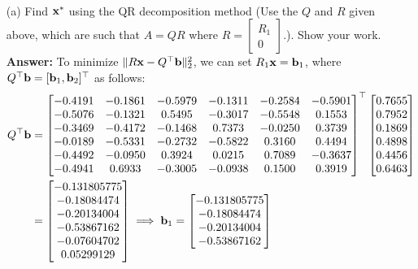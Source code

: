 \documentclass{article}
\newcommand{\bx}{{\bf x}}
\newcommand{\bb}{{\bf b}}
\begin{document}
\begin{itemize}
\begin{align*}
            \end{align*}
            \begin{itemize}
                  \item [(a)] Find $\bx^{*}$ using the QR decomposition method (Use the $Q$ and $R$ given above, which are such that $A = QR$ where $R = \left[\begin{matrix} R_1 \\ 0 \end{matrix}\right]$.). Show your work.\\
                        \textbf{Answer:} To minimize $\|R\bx-Q^{\top}\bb\|_2^2$, we can set $R_1\bx=\bb_1$, where $Q^{\top}\bb=[\bb_1,\bb_2]^{\top}$ as follows:
                        \begin{align*}
                              Q^{\top}\bb & = \left[\begin{matrix} -0.4191 & -0.1861 & -0.5979 & -0.1311 & -0.2584 & -0.5901 \\ -0.5076 & -0.1321 & 0.5495 & -0.3017 & -0.5548 & 0.1553 \\ -0.3469 & -0.4172 & -0.1468 & 0.7373 & -0.0250 & 0.3739 \\ -0.0189 & -0.5331 & -0.2732 & -0.5822 & 0.3160 & 0.4494 \\ -0.4492 & -0.0950 & 0.3924 & 0.0215 & 0.7089 & -0.3637 \\ -0.4941 & 0.6933 & -0.3005 & -0.0938 & 0.1500 & 0.3919 \end{matrix}\right]^{\top}\left[\begin{matrix} 0.7655 \\ 0.7952 \\ 0.1869 \\ 0.4898 \\ 0.4456 \\ 0.6463 \end{matrix}\right]        \\
                                          & = \left[\begin{matrix} -0.131805775 \\ -0.18084474 \\ -0.20134004 \\ -0.53867162 \\ -0.07604702 \\ 0.05299129 \end{matrix}\right]\implies\bb_1=\left[\begin{matrix} -0.131805775 \\ -0.18084474 \\ -0.20134004 \\ -0.53867162 \end{matrix}\right]

\end{align*}
\end{itemize}
\end{itemize}
\end{document}
